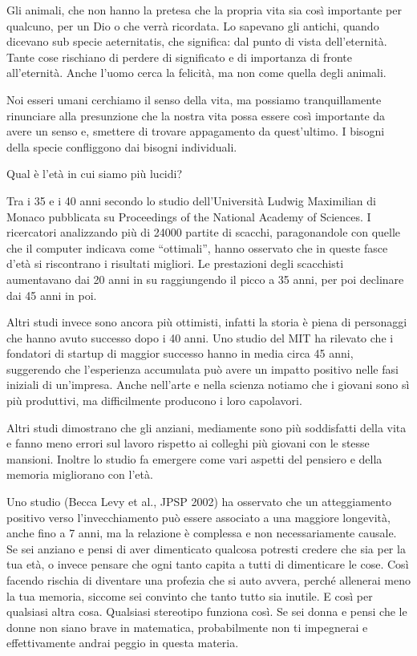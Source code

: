 \documentclass[12pt]{book} %
\begin{document}
Gli animali, che non hanno la pretesa che la propria vita sia così importante per qualcuno, per un Dio o che verrà
ricordata. Lo sapevano gli
antichi, quando dicevano sub specie aeternitatis, che significa: dal punto di vista dell'eternità. Tante cose rischiano di perdere di
significato e di importanza di fronte all'eternità. Anche l'uomo cerca la felicità, ma non come quella degli animali.

Noi esseri umani cerchiamo il senso della vita, ma possiamo tranquillamente rinunciare alla presunzione che la nostra
vita possa essere così importante da avere un senso e, smettere di trovare appagamento da
quest'ultimo. I bisogni della specie confliggono dai bisogni individuali.

\begin{mdframed}[linewidth=1pt]
Qual è l'età in cui siamo più lucidi?

Tra i 35 e i 40 anni secondo lo studio dell'Università Ludwig Maximilian di Monaco pubblicata su Proceedings of the
National Academy of Sciences. I ricercatori analizzando più di 24000 partite di scacchi, paragonandole con quelle che
il computer indicava come “ottimali”, hanno osservato che in queste fasce d'età si riscontrano i
risultati migliori. Le prestazioni degli scacchisti aumentavano dai 20 anni in su raggiungendo il picco a 35 anni, per
poi declinare dai 45 anni in poi. 

Altri studi invece sono ancora più ottimisti, infatti la storia è piena di personaggi che hanno avuto successo dopo i 40
anni. Uno studio del MIT ha rilevato che i fondatori di startup di maggior successo hanno in media circa 45 anni, suggerendo che l’esperienza accumulata può avere un impatto positivo nelle fasi iniziali di un’impresa. Anche nell'arte e
nella scienza notiamo che i giovani sono sì più produttivi, ma difficilmente producono i loro capolavori.

Altri studi dimostrano che gli anziani, mediamente sono più soddisfatti della vita e fanno meno errori sul lavoro
rispetto ai colleghi più giovani con le stesse mansioni. Inoltre lo studio fa emergere come vari aspetti del pensiero e
della memoria migliorano con l'età.

Uno studio (Becca Levy et al., JPSP 2002) ha osservato che un atteggiamento positivo verso l’invecchiamento può essere associato a una maggiore longevità, anche fino a 7 anni, ma la relazione è complessa e non necessariamente causale. Se sei anziano e pensi di aver dimenticato
qualcosa potresti credere che sia per la tua età, o invece pensare che ogni tanto capita a tutti di dimenticare le
cose. Così facendo rischia di diventare una profezia che si auto avvera, perché allenerai meno la tua memoria, siccome sei
convinto che tanto tutto sia inutile. E così per qualsiasi altra cosa. Qualsiasi stereotipo funziona così. Se sei donna
e pensi che le donne non siano brave in matematica, probabilmente non ti impegnerai e effettivamente andrai peggio in
questa materia.


\end{mdframed}
\end{document}
